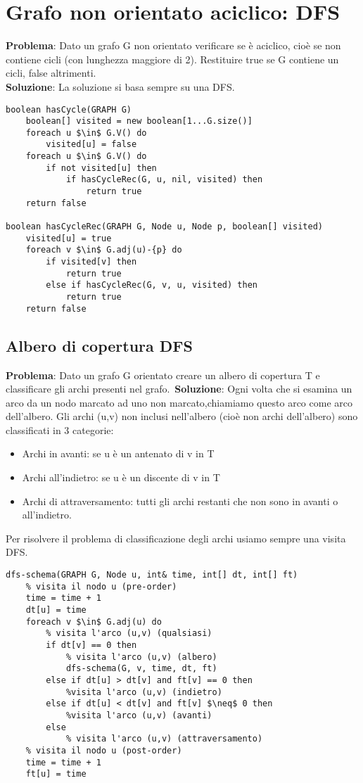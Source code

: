 \documentclass[../cheatSheetAlgoritmi.tex]{subfiles}
\begin{document}
\section{Grafo non orientato aciclico: DFS}
\textbf{Problema}: Dato un grafo G non orientato verificare se è aciclico, cioè se non contiene cicli (con lunghezza maggiore di 2). Restituire true se G contiene un cicli, false altrimenti.\\
\textbf{Soluzione}: La soluzione si basa sempre su una DFS. \
\begin{lstlisting}[caption= Grafo non orientato aciclico (hasCycle)]
boolean hasCycle(GRAPH G)
	boolean[] visited = new boolean[1...G.size()]
	foreach u $\in$ G.V() do
		visited[u] = false
	foreach u $\in$ G.V() do
		if not visited[u] then
			if hasCycleRec(G, u, nil, visited) then
				return true
	return false

boolean hasCycleRec(GRAPH G, Node u, Node p, boolean[] visited)
	visited[u] = true
	foreach v $\in$ G.adj(u)-{p} do
		if visited[v] then
			return true
		else if hasCycleRec(G, v, u, visited) then
			return true
	return false
\end{lstlisting}

 
\subsection{Albero di copertura DFS}
\textbf{Problema}: Dato un grafo G orientato creare un albero di copertura T e classificare gli archi presenti nel grafo.\
\textbf{Soluzione}: Ogni volta che si esamina un arco da un nodo marcato ad uno non marcato,chiamiamo questo arco come arco dell'albero. Gli archi (u,v) non inclusi nell'albero (cioè non archi dell'albero) sono classificati in 3 categorie: 

\begin{itemize}
 	\item Archi in avanti: se u è un antenato di v in T
 	\item Archi all'indietro: se u è un discente di v in T
 	\item Archi di attraversamento: tutti gli archi restanti che non sono in avanti o all'indietro.
\end{itemize}
Per risolvere il problema di classificazione degli archi usiamo sempre una visita DFS.

\begin{lstlisting}[caption= Albero di copertura]
% time: contatore, dt: discovery time (tempo di scoperta del nodo), ft: finish time (tempo di fine visita del nodo e dei suoi archi)
dfs-schema(GRAPH G, Node u, int& time, int[] dt, int[] ft)
	% visita il nodo u (pre-order)
	time = time + 1
	dt[u] = time
	foreach v $\in$ G.adj(u) do
		% visita l'arco (u,v) (qualsiasi)
		if dt[v] == 0 then
			% visita l'arco (u,v) (albero)
			dfs-schema(G, v, time, dt, ft)
		else if dt[u] > dt[v] and ft[v] == 0 then
			%visita l'arco (u,v) (indietro)
		else if dt[u] < dt[v] and ft[v] $\neq$ 0 then
			%visita l'arco (u,v) (avanti)
		else
			% visita l'arco (u,v) (attraversamento) 
	% visita il nodo u (post-order)
	time = time + 1
	ft[u] = time
\end{lstlisting}
\end{document}
